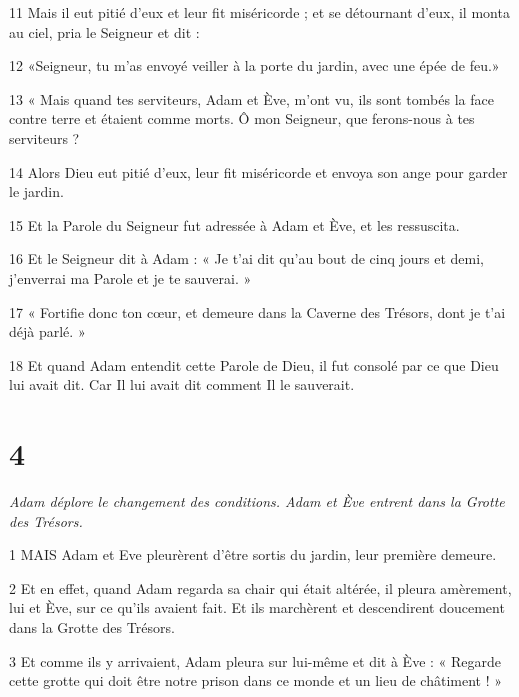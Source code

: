 \par 11 Mais il eut pitié d'eux et leur fit miséricorde ; et se détournant d'eux, il monta au ciel, pria le Seigneur et dit :

\par 12 «Seigneur, tu m'as envoyé veiller à la porte du jardin, avec une épée de feu.»

\par 13 « Mais quand tes serviteurs, Adam et Ève, m'ont vu, ils sont tombés la face contre terre et étaient comme morts. Ô mon Seigneur, que ferons-nous à tes serviteurs ?

\par 14 Alors Dieu eut pitié d'eux, leur fit miséricorde et envoya son ange pour garder le jardin.

\par 15 Et la Parole du Seigneur fut adressée à Adam et Ève, et les ressuscita.

\par 16 Et le Seigneur dit à Adam : « Je t'ai dit qu'au bout de cinq jours et demi, j'enverrai ma Parole et je te sauverai. »

\par 17 « Fortifie donc ton cœur, et demeure dans la Caverne des Trésors, dont je t'ai déjà parlé. »

\par 18 Et quand Adam entendit cette Parole de Dieu, il fut consolé par ce que Dieu lui avait dit. Car Il lui avait dit comment Il le sauverait.

\chapter{4}

\par \textit{Adam déplore le changement des conditions. Adam et Ève entrent dans la Grotte des Trésors.}

\par 1 MAIS Adam et Eve pleurèrent d'être sortis du jardin, leur première demeure.

\par 2 Et en effet, quand Adam regarda sa chair qui était altérée, il pleura amèrement, lui et Ève, sur ce qu'ils avaient fait. Et ils marchèrent et descendirent doucement dans la Grotte des Trésors.

\par 3 Et comme ils y arrivaient, Adam pleura sur lui-même et dit à Ève : « Regarde cette grotte qui doit être notre prison dans ce monde et un lieu de châtiment ! »

